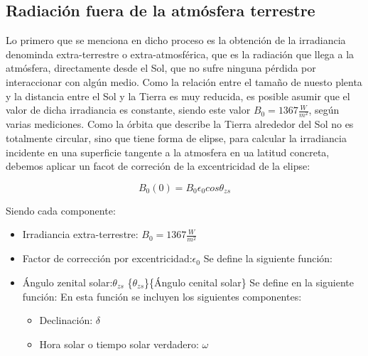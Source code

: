 \subsection{Radiación fuera de la atmósfera terrestre}
\label{sec:org25f0941}
Lo primero que se menciona en dicho proceso es la obtención de la irradiancia denominda extra-terrestre o extra-atmosférica, que es la radiación que llega a la atmósfera, directamente desde el Sol, que no sufre ninguna pérdida por interaccionar con algún medio. Como la relación entre el tamaño de nuesto plenta y la distancia entre el Sol y la Tierra es muy reducida, es posible asumir que el valor de dicha irradiancia es constante, siendo este valor \(B_0=1367\frac{W}{m^2}\), según varias mediciones.
Como la órbita que describe la Tierra alrededor del Sol no es totalmente circular, sino que tiene forma de elipse, para calcular la irradiancia incidente en una superficie tangente a la atmosfera en ua latitud concreta, debemos aplicar un facot de correción de la excentricidad de la elipse:
\begin{center}
\[
B_0(0)=B_0\epsilon_0cos\theta_{zs}
\]
\end{center}
Siendo cada componente:
\begin{itemize}
\item Irradiancia extra-terrestre: \(B_0=1367\frac{W}{m^2}\) 
\item Factor de corrección por excentricidad:\(\epsilon_0\)
Se define la siguiente función:
\item Ángulo zenital solar:\(\theta_{zs}\) \nomenclature[thetazs]\{\(\theta_{zs}\)\}\{Ángulo cenital solar\}
Se define en la siguiente función:
En esta función se incluyen los siguientes componentes:
\begin{itemize}
\item Declinación: \(\delta\) 
\item Hora solar o tiempo solar verdadero: \(\omega\) 
\end{itemize}
\end{itemize}


